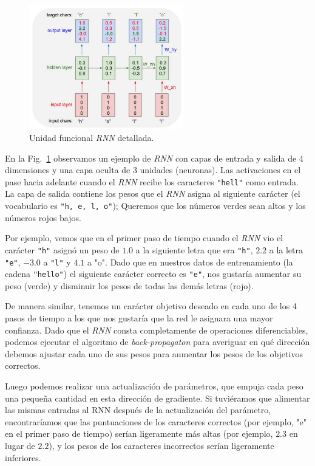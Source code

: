 \documentclass[a4paper,12pt]{article}
\begin{document}
\begin{figure}[H]
	\begin{center}				
	\includegraphics[width=0.6\textwidth]{tesis_29.png}
  	\caption{Unidad funcional \textit{RNN} detallada.}
  	\label{fig:rnnexample}
  	\end{center}
\end{figure}

En la Fig.~\ref{fig:rnnexample} observamos un ejemplo de \textit{RNN} con capas de entrada y salida de 4 dimensiones y una capa oculta de 3 unidades (neuronas). Las activaciones en el pase hacia adelante cuando el \textit{RNN} recibe los caracteres \texttt{"hell"} como entrada. La capa de salida contiene los pesos que el \textit{RNN} asigna al siguiente carácter (el vocabulario es \texttt{"h, e, l, o"}); Queremos que los números verdes sean altos y los números rojos bajos.

Por ejemplo, vemos que en el primer paso de tiempo cuando el \textit{RNN} vio el carácter \texttt{"h"} asignó un peso de $1.0$ a la siguiente letra que era \texttt{"h"}, $2.2$ a la letra \texttt{"e"}, $-3.0$ a \texttt{"l"} y $4.1$ a "o". Dado que en nuestros datos de entrenamiento (la cadena \texttt{"hello"}) el siguiente carácter correcto es \texttt{"e"}, nos gustaría aumentar su peso (verde) y disminuir los pesos de todas las demás letras (rojo). 

De manera similar, tenemos un carácter objetivo deseado en cada uno de los 4 pasos de tiempo a los que nos gustaría que la red le asignara una mayor confianza. Dado que el \textit{RNN} consta completamente de operaciones diferenciables, podemos ejecutar el algoritmo de \textit{back-propagaton} para averiguar en qué dirección debemos ajustar cada uno de sus pesos para aumentar los pesos de los objetivos correctos. 

Luego podemos realizar una actualización de parámetros, que empuja cada peso una pequeña cantidad en esta dirección de gradiente. Si tuviéramos que alimentar las mismas entradas al RNN después de la actualización del parámetro, encontraríamos que las puntuaciones de los caracteres correctos (por ejemplo, "e" en el primer paso de tiempo) serían ligeramente más altas (por ejemplo, $2.3$ en lugar de $2.2$), y los pesos de los caracteres incorrectos serían ligeramente inferiores.
\end{document}
